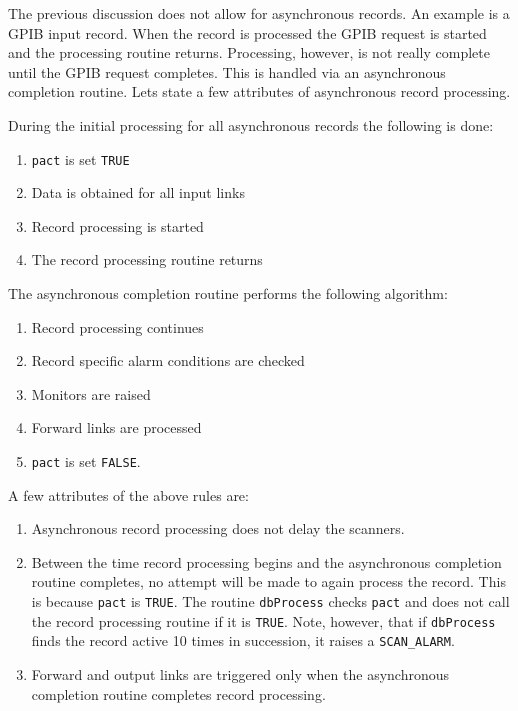 The previous discussion does not allow for asynchronous records. An example is a GPIB input record. When the record is 
processed the GPIB request is started and the processing routine returns. Processing, however, is not really complete until 
the GPIB request completes. This is handled via an asynchronous completion routine. Lets state a few attributes of 
asynchronous record processing. 

During the initial processing for all asynchronous records the following is done:

\begin{enumerate}
\item \verb|pact| is set \verb|TRUE|

\item Data is obtained for all input links

\item Record processing is started

\item The record processing routine returns

\end{enumerate}

The asynchronous completion routine performs the following algorithm:

\begin{enumerate}
\item Record processing continues

\item Record specific alarm conditions are checked

\item Monitors are raised

\item Forward links are processed

\item \verb|pact| is set \verb|FALSE|.

\end{enumerate}

A few attributes of the above rules are:

\begin{enumerate}
\item Asynchronous record processing does not delay the scanners.

\item Between the time record processing begins and the asynchronous completion routine completes, no attempt will be 
made to again process the record. This is because \verb|pact| is \verb|TRUE|. The routine \verb|dbProcess| checks \verb|pact| and does 
not call the record processing routine if it is \verb|TRUE|. Note, however, that if \verb|dbProcess| finds the record active 10 
times in succession, it raises a \verb|SCAN_ALARM|.

\item Forward and output links are triggered only when the asynchronous completion routine completes record 
processing.

\end{enumerate}


